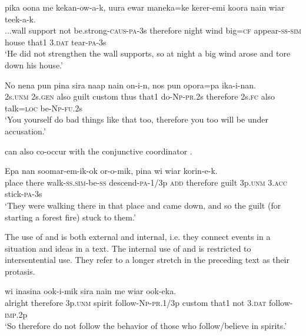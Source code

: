 \ea%
\label{ex:8:x1405}
\gll {\dots}pika  oona  me  kekan-ow-a-k,    uura ewar  maneka=ke  kerer-emi  koora  nain  wiar teek-a-k.\\
...wall  support  not  be.strong-\textsc{caus}-\textsc{pa}-3s  therefore  night wind  big=\textsc{cf}  appear-\textsc{ss}-\textsc{sim}  house  that1  3.\textsc{dat} tear-\textsc{pa}-3s\\
\glt`He did not strengthen the wall supports, so at night a big wind arose and tore down his house.'
\z


\ea%
\label{ex:8:x1408}
\gll No  nena  pun  pina  sira  naap  nain  on-i-n,   nos  pun  opora=pa  ika-i-nan.\\
2s.\textsc{unm}  2s.\textsc{gen}  also  guilt  custom  thus  that1  do-\textsc{Np}-\textsc{pr}.2s therefore  2s.\textsc{fc} also talk=\textsc{loc} be-\textsc{Np}-\textsc{fu}.2s\\
\glt`You yourself do bad things like that too, therefore you too will be under accusation.'
\z


 can also co-occur with the conjunctive coordinator . 

\ea%
\label{ex:8:x1403}
\gll Epa  nan  soomar-em-ik-ok  or-o-mik,     pina  wi  wiar  korin-e-k.  \\
place  there  walk-\textsc{ss}.\textsc{sim}-be-\textsc{ss} descend-\textsc{pa}-1/3p \textsc{add}  therefore  guilt  3p.\textsc{unm} 3.\textsc{acc} stick-\textsc{pa}-3s\\
\glt`They were walking there in that place and came down, and so the guilt (for starting a forest fire) stuck to them.'
\z


The use of  and  is both external and internal, i.e. they connect events in a situation and ideas in a text. The internal use of  and  is restricted to intersentential use. They refer to a longer stretch in the preceding text as their protasis.

\ea%
\label{ex:8:x1407}
\gll {}    wi  inasina  ook-i-mik sira  nain  me  wiar  ook-eka.  \\
alright  therefore  3p.\textsc{unm} spirit  follow-\textsc{Np}-\textsc{pr}.1/3p custom  that1  not  3.\textsc{dat} follow-\textsc{imp}.2p\\
\glt`So therefore do not follow the behavior of those who follow/believe in spirits.'
\z

